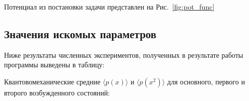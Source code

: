 \documentclass[a4paper,12pt]{article}
\begin{document}
Потенциал из постановки задачи представлен на Рис.~\ref{fig:pot_func}






\subsection{Значения искомых параметров}\label{subsec:results_values}

Ниже результаты численных экспериментов, полученных в результате работы программы выведены в таблицу:

Квантовомеханические средние $\langle p(x) \rangle$ и $\langle p(x^2) \rangle$ для основного, первого и второго возбужденного состояний:
\end{document}
